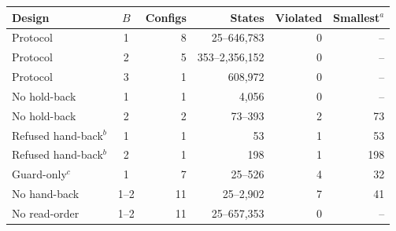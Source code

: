 
\begin{tabular}{@{}lcrrrr@{}}
\toprule
Design & $B$ & Configs & States & Violated & Smallest$^a$ \\
\midrule
Protocol & 1 & 8 & 25--646,783 & 0 & -- \\
Protocol & 2 & 5 & 353--2,356,152 & 0 & -- \\
Protocol & 3 & 1 & 608,972 & 0 & -- \\
No hold-back & 1 & 1 & 4,056 & 0 & -- \\
No hold-back & 2 & 2 & 73--393 & 2 & 73 \\
Refused hand-back$^b$ & 1 & 1 & 53 & 1 & 53 \\
Refused hand-back$^b$ & 2 & 1 & 198 & 1 & 198 \\
Guard-only$^c$ & 1 & 7 & 25--526 & 4 & 32 \\
No hand-back & 1--2 & 11 & 25--2,902 & 7 & 41 \\
No read-order & 1--2 & 11 & 25--657,353 & 0 & -- \\
\bottomrule
\end{tabular}
